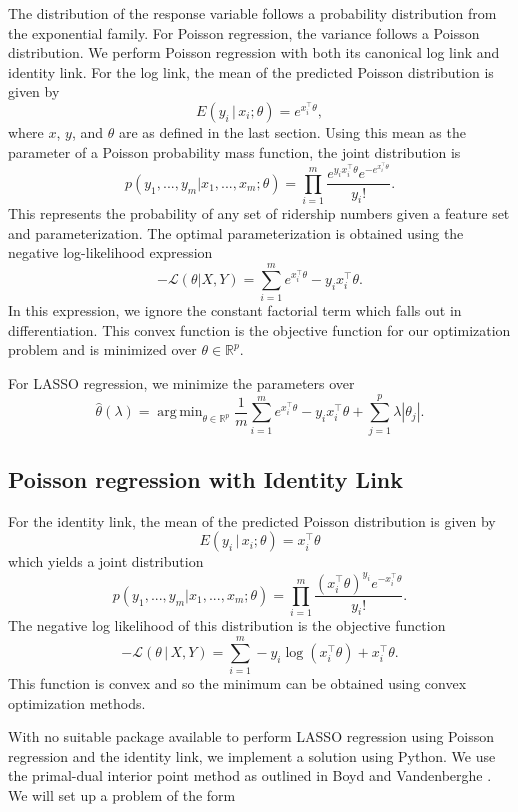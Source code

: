 \documentclass[11pt]{report}
\DeclareMathOperator*{\argmin}{arg\,min}
\begin{document}
The distribution of the response variable follows a probability distribution from the exponential family. For Poisson regression, the variance follows a Poisson distribution. We perform Poisson regression with both its canonical log link and identity link. For the log link, the mean of the predicted Poisson distribution is given by 
\[E(y_i\,|\,x_i;\theta) = e^{x_i^\top\theta},\]
where $x$, $y$, and $\theta$ are as defined in the last section. 
Using this mean as the parameter of a Poisson probability mass function, the joint distribution is
\[p(y_1, ..., y_m|x_1, ..., x_m; \theta) = \prod_{i=1}^m \frac{e^{y_ix_i^{\top} \theta}e^{-e^{x_i^{\top}\theta}}}{y_i!}.\]
This represents the probability of any set of ridership numbers given a feature set and parameterization. The optimal parameterization is obtained using the negative log-likelihood expression
\[-\mathcal{L}(\theta|X, Y) = \sum_{i=1}^m e^{x_i^\top\theta}-y_ix_i^\top\theta. \]
In this expression, we ignore the constant factorial term which falls out in differentiation. This convex function is the objective function for our optimization problem and is minimized over $\theta\in\mathbb{R}^p$.

For LASSO regression, we minimize the parameters \cite{Young2007} over  
\[\hat{\theta}(\lambda) = \argmin_{\theta\in\mathbb{R}^p}  \frac{1}{m}\sum_{i=1}^m e^{x_i^\top\theta}-y_ix_i^\top\theta  + \sum_{j=1}^p\lambda\left|\theta_j\right|.\]

\subsection{Poisson regression with Identity Link}

For the identity link, the mean of the predicted Poisson distribution is given by $$E(y_i\,|\,x_i;\theta) = x_i^\top\theta$$ which yields a joint distribution 
$$p(y_1,...,y_m|x_1,...,x_m;\theta) = \prod_{i=1}^m \frac{\left(x_i^\top\theta\right)^{y_i}e^{-x_i^\top\theta}}{y_i!}. $$
The negative log likelihood of this distribution is the objective function
\begin{equation}-\mathcal{L}\left(\theta\,|\,X, Y\right) = \sum_{i=1}^m -y_i\log{\left(x_i^\top\theta\right)} +x_i^\top\theta. \label{eq:piloglik}\end{equation} This function is convex and so the minimum can be obtained using convex optimization methods. 

With no suitable package available to perform LASSO regression using Poisson regression and the identity link, we implement a solution using Python. We use the primal-dual interior point method as outlined in Boyd and Vandenberghe \cite{Boyd2004}. We will set up a problem of the form 
\end{document}
